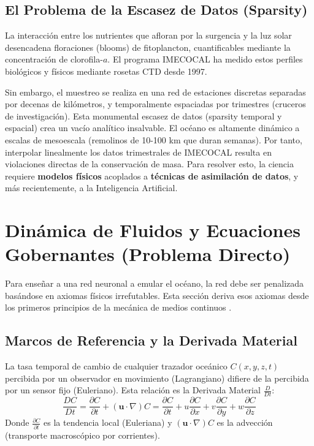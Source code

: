 \documentclass[11pt,a4paper]{article}
\begin{document}
\subsection{El Problema de la Escasez de Datos (Sparsity)}
La interacción entre los nutrientes que afloran por la surgencia y la luz solar desencadena floraciones (blooms) de fitoplancton, cuantificables mediante la concentración de clorofila-$a$. El programa IMECOCAL ha medido estos perfiles biológicos y físicos mediante rosetas CTD desde 1997.

Sin embargo, el muestreo se realiza en una red de estaciones discretas separadas por decenas de kilómetros, y temporalmente espaciadas por trimestres (cruceros de investigación). Esta monumental escasez de datos (sparsity temporal y espacial) crea un vacío analítico insalvable. El océano es altamente dinámico a escalas de mesoescala (remolinos de 10-100 km que duran semanas). Por tanto, interpolar linealmente los datos trimestrales de IMECOCAL resulta en violaciones directas de la conservación de masa. 
Para resolver esto, la ciencia requiere \textbf{modelos físicos} acoplados a \textbf{técnicas de asimilación de datos}, y más recientemente, a la Inteligencia Artificial.

\newpage
\section{Dinámica de Fluidos y Ecuaciones Gobernantes (Problema Directo)}

Para enseñar a una red neuronal a emular el océano, la red debe ser penalizada basándose en axiomas físicos irrefutables. Esta sección deriva esos axiomas desde los primeros principios de la mecánica de medios continuos \cite{gill1982}.

\subsection{Marcos de Referencia y la Derivada Material}
La tasa temporal de cambio de cualquier trazador oceánico $C(x,y,z,t)$ percibida por un observador en movimiento (Lagrangiano) difiere de la percibida por un sensor fijo (Euleriano). Esta relación es la Derivada Material $\frac{D}{Dt}$:
\begin{equation}
\frac{DC}{Dt} = \frac{\partial C}{\partial t} + (\mathbf{u} \cdot \nabla) C = \frac{\partial C}{\partial t} + u\frac{\partial C}{\partial x} + v\frac{\partial C}{\partial y} + w\frac{\partial C}{\partial z}
\end{equation}
Donde $\frac{\partial C}{\partial t}$ es la tendencia local (Euleriana) y $(\mathbf{u} \cdot \nabla) C$ es la advección (transporte macroscópico por corrientes).
\end{document}
